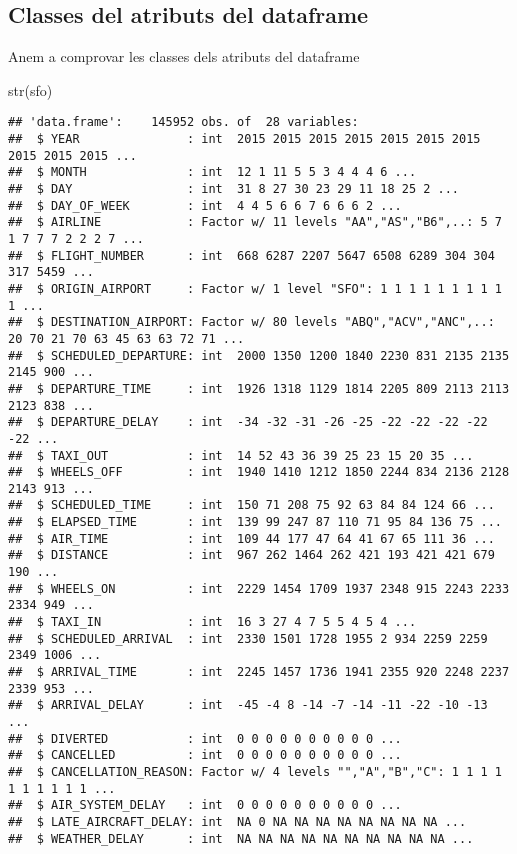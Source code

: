 \documentclass[
]{article}
\newenvironment{Shaded}{\begin{snugshade}}{\end{snugshade}}
\newcommand{\KeywordTok}[1]{\textcolor[rgb]{0.94,0.87,0.69}{#1}}
\newcommand{\NormalTok}[1]{\textcolor[rgb]{0.80,0.80,0.80}{#1}}
\begin{document}
\hypertarget{classes-del-atributs-del-dataframe}{%
\subsection{Classes del atributs del
dataframe}\label{classes-del-atributs-del-dataframe}}

Anem a comprovar les classes dels atributs del dataframe

\begin{Shaded}
\begin{Highlighting}[]
\KeywordTok{str}\NormalTok{(sfo)}
\end{Highlighting}
\end{Shaded}

\begin{verbatim}
## 'data.frame':    145952 obs. of  28 variables:
##  $ YEAR               : int  2015 2015 2015 2015 2015 2015 2015 2015 2015 2015 ...
##  $ MONTH              : int  12 1 11 5 5 3 4 4 4 6 ...
##  $ DAY                : int  31 8 27 30 23 29 11 18 25 2 ...
##  $ DAY_OF_WEEK        : int  4 4 5 6 6 7 6 6 6 2 ...
##  $ AIRLINE            : Factor w/ 11 levels "AA","AS","B6",..: 5 7 1 7 7 7 2 2 2 7 ...
##  $ FLIGHT_NUMBER      : int  668 6287 2207 5647 6508 6289 304 304 317 5459 ...
##  $ ORIGIN_AIRPORT     : Factor w/ 1 level "SFO": 1 1 1 1 1 1 1 1 1 1 ...
##  $ DESTINATION_AIRPORT: Factor w/ 80 levels "ABQ","ACV","ANC",..: 20 70 21 70 63 45 63 63 72 71 ...
##  $ SCHEDULED_DEPARTURE: int  2000 1350 1200 1840 2230 831 2135 2135 2145 900 ...
##  $ DEPARTURE_TIME     : int  1926 1318 1129 1814 2205 809 2113 2113 2123 838 ...
##  $ DEPARTURE_DELAY    : int  -34 -32 -31 -26 -25 -22 -22 -22 -22 -22 ...
##  $ TAXI_OUT           : int  14 52 43 36 39 25 23 15 20 35 ...
##  $ WHEELS_OFF         : int  1940 1410 1212 1850 2244 834 2136 2128 2143 913 ...
##  $ SCHEDULED_TIME     : int  150 71 208 75 92 63 84 84 124 66 ...
##  $ ELAPSED_TIME       : int  139 99 247 87 110 71 95 84 136 75 ...
##  $ AIR_TIME           : int  109 44 177 47 64 41 67 65 111 36 ...
##  $ DISTANCE           : int  967 262 1464 262 421 193 421 421 679 190 ...
##  $ WHEELS_ON          : int  2229 1454 1709 1937 2348 915 2243 2233 2334 949 ...
##  $ TAXI_IN            : int  16 3 27 4 7 5 5 4 5 4 ...
##  $ SCHEDULED_ARRIVAL  : int  2330 1501 1728 1955 2 934 2259 2259 2349 1006 ...
##  $ ARRIVAL_TIME       : int  2245 1457 1736 1941 2355 920 2248 2237 2339 953 ...
##  $ ARRIVAL_DELAY      : int  -45 -4 8 -14 -7 -14 -11 -22 -10 -13 ...
##  $ DIVERTED           : int  0 0 0 0 0 0 0 0 0 0 ...
##  $ CANCELLED          : int  0 0 0 0 0 0 0 0 0 0 ...
##  $ CANCELLATION_REASON: Factor w/ 4 levels "","A","B","C": 1 1 1 1 1 1 1 1 1 1 ...
##  $ AIR_SYSTEM_DELAY   : int  0 0 0 0 0 0 0 0 0 0 ...
##  $ LATE_AIRCRAFT_DELAY: int  NA 0 NA NA NA NA NA NA NA NA ...
##  $ WEATHER_DELAY      : int  NA NA NA NA NA NA NA NA NA NA ...
\end{verbatim}
\end{document}
